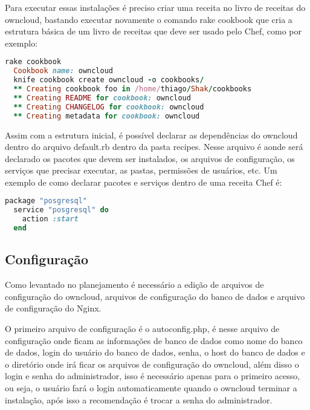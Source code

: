 Para executar essas instalações é preciso criar uma receita no livro de receitas
do owncloud, bastando executar novamente o comando rake cookbook que cria a estrutura básica
de um livro de receitas que deve ser usado pelo Chef, como por exemplo:

\begin{lstlisting}[language=Ruby,label=dice_index,caption={Exemplo de criação de estrutura básica de livro de receitas do owncloud com shak}]
  rake cookbook
  Cookbook name: owncloud
  knife cookbook create owncloud -o cookbooks/
  ** Creating cookbook foo in /home/thiago/Shak/cookbooks
  ** Creating README for cookbook: owncloud
  ** Creating CHANGELOG for cookbook: owncloud
  ** Creating metadata for cookbook: owncloud
\end{lstlisting}

Assim com a estrutura inicial, é possível declarar as dependências do owncloud
dentro do arquivo default.rb dentro da pasta recipes. Nesse arquivo é aonde
será declarado os pacotes que devem ser instalados, os arquivos de configuração,
os serviços que precisar executar, as pastas, permissões de usuários, etc. Um exemplo
de como declarar pacotes e serviços dentro de uma receita Chef é:

\begin{lstlisting}[language=Ruby,label=dice_index,caption={Exemplo de como habilitar serviço do postgresql com chef}]
  package "posgresql"
  service "posgresql" do
    action :start
  end
\end{lstlisting}

\subsection{Configuração}

Como levantado no planejamento é necessário a edição de arquivos de configuração
do owncloud, arquivos de configuração do banco de dados e arquivo de configuração
do Nginx.

O primeiro arquivo de configuração é o autoconfig.php, é nesse arquivo de
configuração onde ficam as informações de banco de dados como nome do banco de dados,
login do usuário do banco de dados, senha, o host do banco de dados e o diretório
onde irá ficar os arquivos de configuração do owncloud, além disso o login e senha
do administrador, isso é necessário apenas para o primeiro acesso, ou seja, o usuário
fará o login automaticamente quando o owncloud terminar a instalação, após isso
a recomendação é trocar a senha do administrador.

